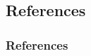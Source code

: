 \documentclass[11pt,t,usepdftitle=false,aspectratio=169]{beamer}
\begin{document}
\subsection{References}
\begin{frame}[allowframebreaks]
	\frametitle{References}
	
	\nocite{bib_uibk_latex}
	
	
	
\end{frame}
\end{document}
